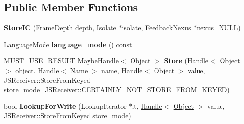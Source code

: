 \subsection*{Public Member Functions}
\begin{DoxyCompactItemize}
\item 
{\bfseries Store\+IC} (Frame\+Depth depth, \hyperlink{classv8_1_1internal_1_1_isolate}{Isolate} $\ast$isolate, \hyperlink{classv8_1_1internal_1_1_feedback_nexus}{Feedback\+Nexus} $\ast$nexus=N\+U\+LL)\hypertarget{classv8_1_1internal_1_1_store_i_c_a18b1863eb7de54f2021f7797c35d6be1}{}\label{classv8_1_1internal_1_1_store_i_c_a18b1863eb7de54f2021f7797c35d6be1}

\item 
Language\+Mode {\bfseries language\+\_\+mode} () const \hypertarget{classv8_1_1internal_1_1_store_i_c_a1fd73fb43d4e2d4eb3fad488a0fb99ae}{}\label{classv8_1_1internal_1_1_store_i_c_a1fd73fb43d4e2d4eb3fad488a0fb99ae}

\item 
M\+U\+S\+T\+\_\+\+U\+S\+E\+\_\+\+R\+E\+S\+U\+LT \hyperlink{classv8_1_1internal_1_1_maybe_handle}{Maybe\+Handle}$<$ \hyperlink{classv8_1_1internal_1_1_object}{Object} $>$ {\bfseries Store} (\hyperlink{classv8_1_1internal_1_1_handle}{Handle}$<$ \hyperlink{classv8_1_1internal_1_1_object}{Object} $>$ object, \hyperlink{classv8_1_1internal_1_1_handle}{Handle}$<$ \hyperlink{classv8_1_1internal_1_1_name}{Name} $>$ name, \hyperlink{classv8_1_1internal_1_1_handle}{Handle}$<$ \hyperlink{classv8_1_1internal_1_1_object}{Object} $>$ value, J\+S\+Receiver\+::\+Store\+From\+Keyed store\+\_\+mode=J\+S\+Receiver\+::\+C\+E\+R\+T\+A\+I\+N\+L\+Y\+\_\+\+N\+O\+T\+\_\+\+S\+T\+O\+R\+E\+\_\+\+F\+R\+O\+M\+\_\+\+K\+E\+Y\+ED)\hypertarget{classv8_1_1internal_1_1_store_i_c_ae77a6c039a31c262f3156c0d91b64b66}{}\label{classv8_1_1internal_1_1_store_i_c_ae77a6c039a31c262f3156c0d91b64b66}

\item 
bool {\bfseries Lookup\+For\+Write} (Lookup\+Iterator $\ast$it, \hyperlink{classv8_1_1internal_1_1_handle}{Handle}$<$ \hyperlink{classv8_1_1internal_1_1_object}{Object} $>$ value, J\+S\+Receiver\+::\+Store\+From\+Keyed store\+\_\+mode)\hypertarget{classv8_1_1internal_1_1_store_i_c_ae01fdb30b9f9e64f6a81e1768ca373ce}{}\label{classv8_1_1internal_1_1_store_i_c_ae01fdb30b9f9e64f6a81e1768ca373ce}

\end{DoxyCompactItemize}
